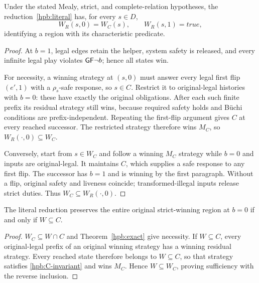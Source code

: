 \begin{theorem}
\label{hpb:exact}
Under the stated Mealy, strict, and complete-relation hypotheses,
the reduction~\eqref{hpb:literal} has, for every $s\in D$,
\begin{equation}
 W_R(s,0)=W_C(s),\qquad W_R(s,1)=\mathit{true},
 \label{hpb:exact-equation}
\end{equation}
identifying a region with its characteristic predicate.
\end{theorem}
\begin{proof}
At $b=1$, legal edges retain the helper, system safety is released,
and every infinite legal play violates $\mathsf{G}\mathsf{F}\neg b$; hence all states win.

For necessity, a winning strategy at $(s,0)$ must answer every legal
first flip $(e',1)$ with a $\rho_s$-safe response, so $s\in C$.
Restrict it to original-legal histories with $b=0$: these have exactly
the original obligations. After each such finite prefix its residual
strategy still wins, because required safety holds and B\"uchi conditions
are prefix-independent. Repeating the first-flip argument gives $C$ at
every reached successor. The restricted strategy therefore wins $M_C$,
so $W_R(\cdot,0)\subseteq W_C$.

Conversely, start from $s\in W_C$ and follow a winning $M_C$ strategy
while $b=0$ and inputs are original-legal. It maintains $C$, which
supplies a safe response to any first flip. The successor has $b=1$
and is winning by the first paragraph. Without a flip, original safety
and liveness coincide; transformed-illegal inputs release strict duties.
Thus $W_C\subseteq W_R(\cdot,0)$.
\end{proof}

\begin{corollary}
\label{hpb:full-preservation}
The literal reduction preserves the entire original strict-winning
region at $b=0$ if and only if $W\subseteq C$.
\end{corollary}
\begin{proof}
$W_C\subseteq W\cap C$ and Theorem~\ref{hpb:exact} give necessity.
If $W\subseteq C$, every original-legal prefix of an original winning
strategy has a winning residual strategy. Every reached state therefore
belongs to $W\subseteq C$, so that strategy satisfies
\eqref{hpb:C-invariant} and wins $M_C$. Hence $W\subseteq W_C$, proving
sufficiency with the reverse inclusion.
\end{proof}

